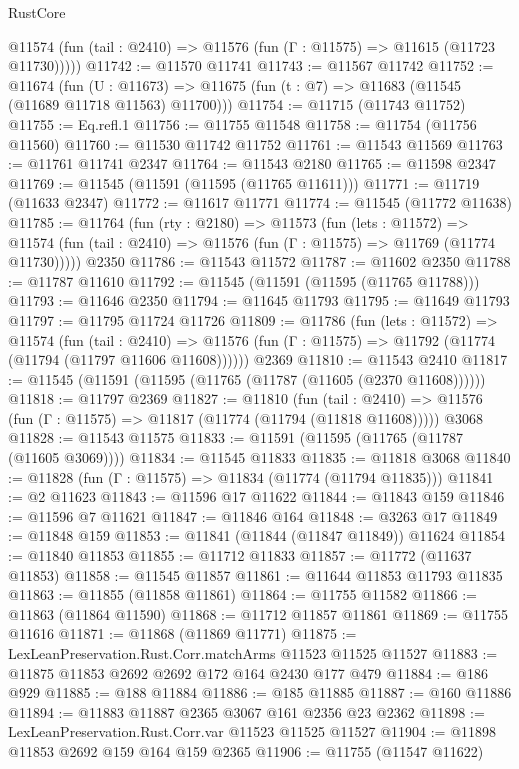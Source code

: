 \begin{lexlean}{RustCore}
\begin{coremodule}
      @11574 (fun (tail : @2410) => @11576 (fun (Γ : @11575) => @11615 (@11723 @11730)))))
@11742 := @11570 @11741
@11743 := @11567 @11742
@11752 := @11674
    (fun (U : @11673) => @11675 (fun (t : @7) => @11683 (@11545 (@11689 @11718 @11563) @11700)))
@11754 := @11715 (@11743 @11752)
@11755 := Eq.refl.{1}
@11756 := @11755 @11548
@11758 := @11754 (@11756 @11560)
@11760 := @11530 @11742 @11752
@11761 := @11543 @11569
@11763 := @11761 @11741 @2347
@11764 := @11543 @2180
@11765 := @11598 @2347
@11769 := @11545 (@11591 (@11595 (@11765 @11611)))
@11771 := @11719 (@11633 @2347)
@11772 := @11617 @11771
@11774 := @11545 (@11772 @11638)
@11785 := @11764
    (fun (rty : @2180) =>
    @11573
      (fun (lets : @11572) =>
      @11574 (fun (tail : @2410) => @11576 (fun (Γ : @11575) => @11769 (@11774 @11730)))))
    @2350
@11786 := @11543 @11572
@11787 := @11602 @2350
@11788 := @11787 @11610
@11792 := @11545 (@11591 (@11595 (@11765 @11788)))
@11793 := @11646 @2350
@11794 := @11645 @11793
@11795 := @11649 @11793
@11797 := @11795 @11724 @11726
@11809 := @11786
    (fun (lets : @11572) =>
    @11574
      (fun (tail : @2410) =>
      @11576 (fun (Γ : @11575) => @11792 (@11774 (@11794 (@11797 @11606 @11608))))))
    @2369
@11810 := @11543 @2410
@11817 := @11545 (@11591 (@11595 (@11765 (@11787 (@11605 (@2370 @11608))))))
@11818 := @11797 @2369
@11827 := @11810
    (fun (tail : @2410) => @11576 (fun (Γ : @11575) => @11817 (@11774 (@11794 (@11818 @11608)))))
    @3068
@11828 := @11543 @11575
@11833 := @11591 (@11595 (@11765 (@11787 (@11605 @3069))))
@11834 := @11545 @11833
@11835 := @11818 @3068
@11840 := @11828 (fun (Γ : @11575) => @11834 (@11774 (@11794 @11835)))
@11841 := @2 @11623
@11843 := @11596 @17 @11622
@11844 := @11843 @159
@11846 := @11596 @7 @11621
@11847 := @11846 @164
@11848 := @3263 @17
@11849 := @11848 @159
@11853 := @11841 (@11844 (@11847 @11849)) @11624
@11854 := @11840 @11853
@11855 := @11712 @11833
@11857 := @11772 (@11637 @11853)
@11858 := @11545 @11857
@11861 := @11644 @11853 @11793 @11835
@11863 := @11855 (@11858 @11861)
@11864 := @11755 @11582
@11866 := @11863 (@11864 @11590)
@11868 := @11712 @11857 @11861
@11869 := @11755 @11616
@11871 := @11868 (@11869 @11771)
@11875 := LexLeanPreservation.Rust.Corr.matchArms @11523 @11525 @11527
@11883 := @11875 @11853 @2692 @2692 @172 @164 @2430 @177 @479
@11884 := @186 @929
@11885 := @188 @11884
@11886 := @185 @11885
@11887 := @160 @11886
@11894 := @11883 @11887 @2365 @3067 @161 @2356 @23 @2362
@11898 := LexLeanPreservation.Rust.Corr.var @11523 @11525 @11527
@11904 := @11898 @11853 @2692 @159 @164 @159 @2365
@11906 := @11755 (@11547 @11622)

\end{coremodule}
\end{lexlean}
